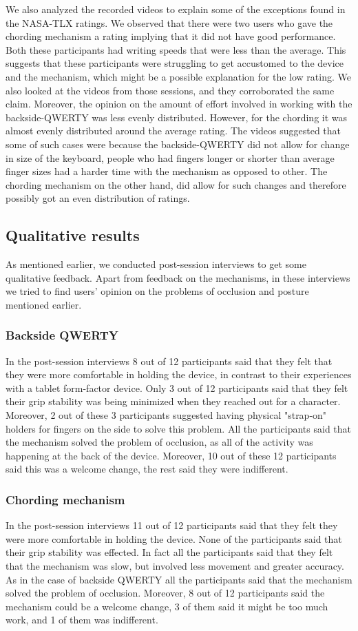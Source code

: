 We also analyzed the recorded videos to explain some of the exceptions found in the NASA-TLX ratings. We observed that there were two users who gave the chording mechanism a rating implying that it did not have good performance. Both these participants had writing speeds that were less than the average. This suggests that these participants were struggling to get accustomed to the device and the mechanism, which might be a possible explanation for the low rating. We also looked at the videos from those sessions, and they corroborated the same claim. Moreover, the opinion on the amount of effort involved in working with the backside-QWERTY was less evenly distributed. However, for the chording it was almost evenly distributed around the average rating. The videos suggested that some of such cases were because the backside-QWERTY did not allow for change in size of the keyboard, people who had fingers longer or shorter than average finger sizes had a harder time with the mechanism as opposed to other. The chording mechanism on the other hand, did allow for such changes and therefore possibly got an even distribution of ratings.

\subsection{Qualitative results}
As mentioned earlier, we conducted post-session interviews to get some qualitative feedback. Apart from feedback on the mechanisms, in these interviews we tried to find users' opinion on the problems of occlusion and posture mentioned earlier.
\subsubsection{Backside QWERTY}
In the post-session interviews 8 out of 12 participants said that they felt that they were more comfortable in holding the device, in contrast to their experiences with a tablet form-factor device.
Only 3 out of 12 participants said that they felt their grip stability was being minimized when they reached out for a character. Moreover, 2 out of these 3 participants suggested having physical "strap-on" holders for fingers on the side to solve this problem. All the participants said that the mechanism solved the problem of occlusion, as all of the activity was happening at the back of the device. Moreover, 10 out of these 12 participants said this was a welcome change, the rest said they were indifferent.
\subsubsection{Chording mechanism}
In the post-session interviews 11 out of 12 participants said that they felt they were more comfortable in holding the device. None of the participants said that their grip stability was effected. In fact all the participants said that they felt that the mechanism was slow, but involved less movement and greater accuracy. As in the case of backside QWERTY all the participants said that the mechanism solved the problem of occlusion. Moreover, 8 out of 12 participants said the mechanism could be a welcome change, 3 of them said it might be too much work, and 1 of them was indifferent.

